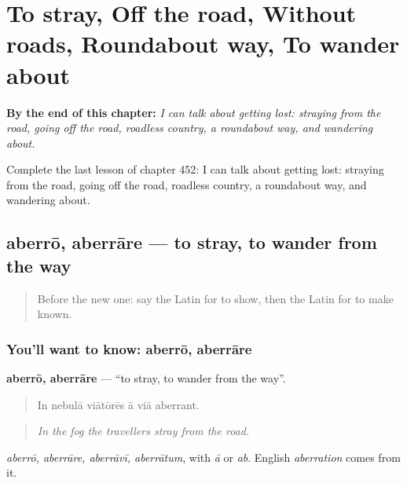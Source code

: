 
\chapter{To stray, Off the road, Without roads, Roundabout way, To wander about}
\label{ch:la-to-stray-off-the-road-without-roads-roundabout-way-to-wander-about}

\begin{chapteropening}
\textbf{By the end of this chapter:} \emph{I can talk about getting lost: straying from the road, going off the road, roadless country, a roundabout way, and wandering about.}

Complete the last lesson of chapter 452: I can talk about getting lost: straying from the road, going off the road, roadless country, a roundabout way, and wandering about.
\end{chapteropening}

\section[aberrō, aberrāre]{aberrō, aberrāre — to stray, to wander from the way}

\label{lesson:LA-C452-aberro}



\begin{quote}
Before the new one: say the Latin for to show, then the Latin for to make known.
\end{quote}

\subsection*{You'll want to know: aberrō, aberrāre}
\textbf{aberrō, aberrāre} — \textquotedblleft{}to stray, to wander from the way\textquotedblright{}.

\begin{quote}
In nebulā viātōrēs ā viā aberrant.
\end{quote}

\begin{quote}
\emph{In the fog the travellers stray from the road.}
\end{quote}

\emph{aberrō, aberrāre, aberrāvī, aberrātum}, with \emph{ā} or \emph{ab}. English \emph{aberration} comes from it.

